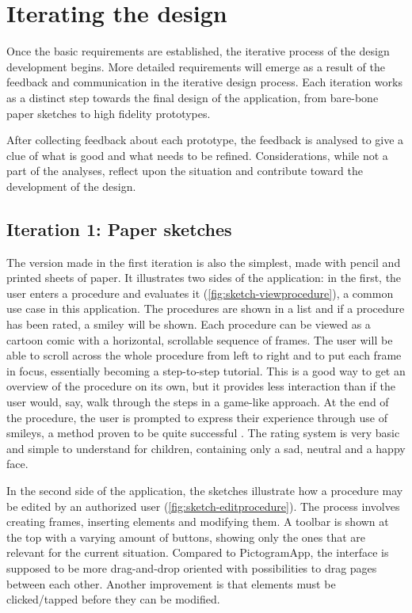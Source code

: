 \chapter{Iterating the design}
\label{ch:iterating}

Once the basic requirements are established, the iterative process of the design development begins. More detailed requirements will emerge as a result of the feedback and communication in the iterative design process. Each iteration works as a distinct step towards the final design of the application, from bare-bone paper sketches to high fidelity prototypes.

After collecting feedback about each prototype, the feedback is analysed to give a clue of what is good and what needs to be refined. Considerations, while not a part of the analyses, reflect upon the situation and contribute toward the development of the design.

\section{Iteration 1: Paper sketches}
\label{sec:iteration1}

The version made in the first iteration is also the simplest, made with pencil and printed sheets of paper. It illustrates two sides of the application: in the first, the user enters a procedure and evaluates it (\autoref{fig:sketch-viewprocedure}), a common use case in this application. The procedures are shown in a list and if a procedure has been rated, a smiley will be shown. Each procedure can be viewed as a cartoon comic with a horizontal, scrollable sequence of frames. The user will be able to scroll across the whole procedure from left to right and to put each frame in focus, essentially becoming a step-to-step tutorial. This is a good way to get an overview of the procedure on its own, but it provides less interaction than if the user would, say, walk through the steps in a game-like approach. At the end of the procedure, the user is prompted to express their experience through use of smileys, a method proven to be quite successful \autocite{stalberg2016}. The rating system is very basic and simple to understand for children, containing only a sad, neutral and a happy face.

In the second side of the application, the sketches illustrate how a procedure may be edited by an authorized user (\autoref{fig:sketch-editprocedure}). The process involves creating frames, inserting elements and modifying them. A toolbar is shown at the top with a varying amount of buttons, showing only the ones that are relevant for the current situation. Compared to PictogramApp, the interface is supposed to be more drag-and-drop oriented with possibilities to drag pages between each other. Another improvement is that elements must be clicked/tapped before they can be modified.

